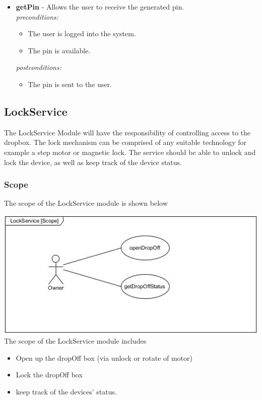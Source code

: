\documentclass[a4paper,12pt]{article}
\begin{document}
\begin{itemize}
		\item \textbf{getPin} - Allows the user to receive the generated pin.\\[0.5cm]
		\textit{preconditions:}
		\begin{itemize}
			\item The user is logged into the system.
			\item The pin is available.
		\end{itemize}
		
		\textit{postconditions:}
		\begin{itemize}
			\item The pin is sent to the user.\\[0.5cm]
		\end{itemize}
	\end{itemize}
	\newpage
	
	\subsection{LockService}
	The LockService Module will have the responsibility of controlling access to the dropbox. The lock mechanism can be comprised of any suitable technology for example a step motor or magnetic lock. The service should be able to unlock and lock the device, as well as keep track of the device status.
	
	\subsubsection{Scope}
	The scope of the LockService module is shown below
	
	\includegraphics[width=1\textwidth]{./Pictures/UML/Usecase/LockServiceUseCase.jpg}\\[0cm]
	
	{\noindent}The scope of the LockService module includes
	\begin{itemize}
		\item Open up the dropOff box (via unlock or rotate of motor)
		\item Lock the dropOff box
		\item keep track of the devices' status.
	\end{itemize}
	
\end{document}
